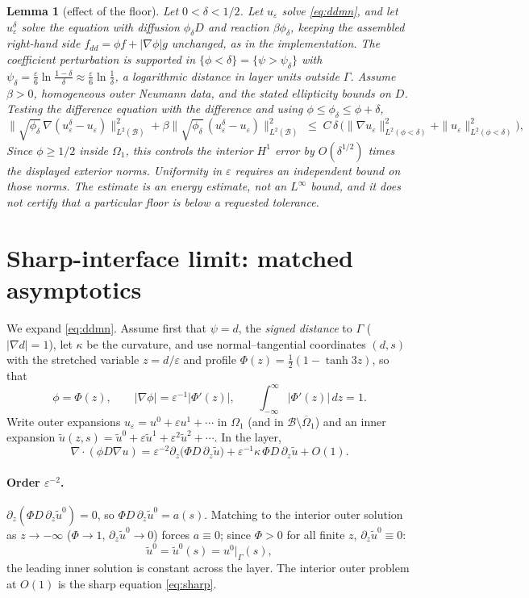 \documentclass[11pt]{article}
\newtheorem{lemma}[theorem]{Lemma}
\theoremstyle{remark}
\newcommand{\dive}{\nabla\!\cdot\!}
\newcommand{\eps}{\varepsilon}
\newcommand{\B}{\mathcal{B}}
\begin{document}
\begin{lemma}[effect of the floor]\label{lem:floor}
Let $0<\delta<1/2$. Let $u_\eps$ solve \eqref{eq:ddmn}, and let
$u_\eps^\delta$ solve the equation with diffusion $\phi_\delta D$ and
reaction $\beta\phi_\delta$, keeping the assembled right-hand side
$f_{dd}=\phi f+|\nabla\phi|g$ unchanged, as in the implementation.
The coefficient perturbation is supported in
$\{\phi<\delta\}=\{\psi>\psi_\delta\}$ with
$\psi_\delta=\tfrac{\eps}{6}\ln\frac{1-\delta}{\delta}
\approx\tfrac{\eps}{6}\ln\frac1\delta$, a logarithmic distance in
layer units outside $\Gamma$. Assume $\beta>0$, homogeneous outer Neumann data,
and the stated ellipticity bounds on $D$. Testing the difference equation with
the difference and using $\phi\le\phi_\delta\le\phi+\delta$,
\[
  \|\sqrt{\phi_\delta}\,\nabla(u_\eps^\delta-u_\eps)\|_{L^2(\B)}^2
  +\beta\|\sqrt{\phi_\delta}\,(u_\eps^\delta-u_\eps)\|_{L^2(\B)}^2
  \;\le\; C\,\delta\,
  \bigl(\|\nabla u_\eps\|^2_{L^2(\phi<\delta)}
  +\|u_\eps\|^2_{L^2(\phi<\delta)}\bigr),
\]
Since $\phi\ge1/2$ inside $\Omega_1$, this controls the interior
$H^1$ error by $O(\delta^{1/2})$ times the displayed exterior norms.
Uniformity in $\eps$ requires an independent bound on those norms.
The estimate is an energy estimate, not an $L^\infty$ bound, and it
does not certify that a particular floor is below a requested tolerance.
\end{lemma}

\section{Sharp-interface limit: matched asymptotics}\label{sec:asymp}

We expand \eqref{eq:ddmn}.  Assume first that $\psi=d$, the
\emph{signed distance} to $\Gamma$ ($|\nabla d|=1$), let $\kappa$ be
the curvature, and use normal--tangential coordinates $(d,s)$ with the
stretched variable $z=d/\eps$ and profile
$\Phi(z)=\tfrac12(1-\tanh 3z)$, so that
\[
  \phi=\Phi(z),\qquad
  |\nabla\phi|=\eps^{-1}|\Phi'(z)|,\qquad
  \int_{-\infty}^{\infty}|\Phi'(z)|\,dz=1 .
\]
Write outer expansions $u_\eps=u^0+\eps u^1+\cdots$ in $\Omega_1$ (and
in $\B\setminus\overline\Omega_1$) and an inner expansion
$\tilde u(z,s)=\tilde u^0+\eps\tilde u^1+\eps^2\tilde u^2+\cdots$.  In
the layer,
\[
  \dive(\phi D\nabla u)=
  \eps^{-2}\partial_z\bigl(\Phi D\,\partial_z\tilde u\bigr)
  +\eps^{-1}\kappa\,\Phi D\,\partial_z\tilde u
  +O(1).
\]

\paragraph{Order $\eps^{-2}$.}
$\partial_z(\Phi D\,\partial_z\tilde u^0)=0$, so
$\Phi D\,\partial_z\tilde u^0=a(s)$.  Matching to the interior outer
solution as $z\to-\infty$ ($\Phi\to1$, $\partial_z\tilde u^0\to0$)
forces $a\equiv0$; since $\Phi>0$ for all finite $z$,
$\partial_z\tilde u^0\equiv 0$:
\begin{equation}\label{eq:u0const}
  \tilde u^0=\tilde u^0(s)=u^0\big|_\Gamma(s),
\end{equation}
the leading inner solution is constant across the layer.  The interior
outer problem at $O(1)$ is the sharp equation \eqref{eq:sharp}.
\end{document}
